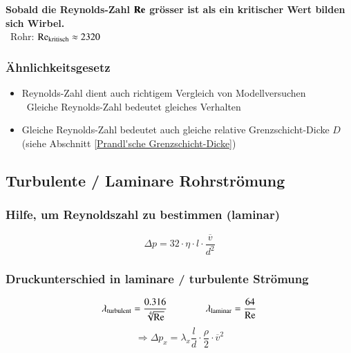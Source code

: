 \medskip

\textbf{Sobald die Reynolds-Zahl $\bm{\mathop{} \! \mathrm{Re}}$ grösser ist als ein kritischer Wert bilden sich Wirbel.} \\
\textrightarrow\ Rohr:  $\mathop{} \! \mathrm{Re}_{\rm kritisch} \approx 2320$


\subsubsection{Ähnlichkeitsgesetz}

\begin{itemize}
    \item Reynolds-Zahl dient auch richtigem Vergleich von Modellversuchen \\
        \textrightarrow\ Gleiche Reynolds-Zahl bedeutet gleiches Verhalten
    \item  Gleiche Reynolds-Zahl bedeutet auch gleiche relative Grenzschicht-Dicke $D$ (siehe Abschnitt \ref{Prandl'sche Grenzschicht-Dicke})
\end{itemize}


\subsection{Turbulente / Laminare Rohrströmung}

\subsubsection{Hilfe, um Reynoldszahl zu bestimmen (laminar)}

\vspace{-0.2cm}

\[\boxed{ \Delta p = 32 \cdot \eta \cdot l \cdot \frac{\overline{v}}{d^2} }  \]


\subsubsection{Druckunterschied in laminare / turbulente Strömung}

\[\lambda_{\rm turbulent} = \frac{0.316}{\sqrt[4]{\mathop{} \! \mathrm{Re}}}  \qquad \qquad \lambda_{\rm laminar} = \frac{64}{\mathop{} \! \mathrm{Re}} \]
\[\boxed{ \Rightarrow \Delta p_x = \lambda_x \frac{l}{d} \cdot \frac{\rho}{2} \cdot \overline{v}^2 } \]



